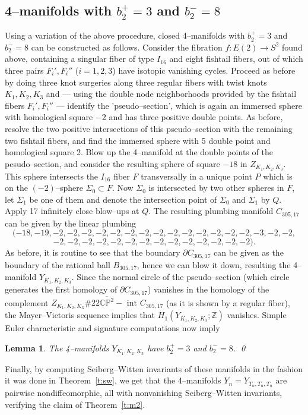 \documentclass[11pt]{gtart}
\newtheorem{lem}[thm]{Lemma}
\theoremstyle{definition}
\numberwithin{equation}{section}
\newcommand{\bfz}{{\mathbb {Z}}}
\newcommand{\cpkk}{{\overline {{\mathbb C}{\mathbb P}^2}}}
\begin{document}
\subsection{4--manifolds with $b_2^+=3$ and $b_2^-=8$}
Using a variation of the above procedure, closed 4--manifolds with
$b_2^+=3$ and $b_2^-=8$ can be constructed as follows. Consider the
fibration $f\colon E(2) \to S^2$ found above, containing a singular
fiber of type $I_{16}$ and eight fishtail fibers, out of which three
pairs $F_i', F_i''$ ($i=1,2,3$) have isotopic vanishing cycles.
Proceed as before by doing three knot surgeries along three regular
fibers with twist knots $K_1,K_2,K_3$ and --- using the double node
neighborhoods provided by the fishtail fibers $F_i',F_i''$ ---
identify the 'pseudo--section', which is again an immersed sphere
with homological square $-2$ and has three positive double points. As
before, resolve the two positive intersections of this
pseudo--section with the remaining two fishtail fibers, and find the
immersed sphere with 5 double point and homological square 2. Blow up
the 4--manifold at the double points of the pesudo--section, and
consider the resulting sphere of square $-18$ in
$Z_{K_1,K_2,K_3}$. This sphere intersects the $I_{16}$ fiber $F$
transversally in a unique point $P$ which is on the $(-2)$--sphere
$\Sigma _0 \subset F$. Now $\Sigma _0$ is intersected by two other
spheres in $F$, let $\Sigma _1$ be one of them and denote the
intersection point of $\Sigma _0$ and $\Sigma _1$ by $Q$. Apply 17
infinitely close blow--ups at $Q$. The resulting plumbing manifold
$C_{305,17}$ can be given by the linear plumbing
\[
(-18,-19,-2,-2,-2,-2,-2,-2,-2,-2,-2,-2,-2,-2,-2,-2,-3,-2,-2,
\]
\[
-2,-2,-2,-2,-2,-2, -2,-2,-2,-2,-2,-2,-2,-2).
\] 
As before, it is routine to see that the boundary
$\partial C_{305,17}$ can be given as the boundary of the rational
ball $B_{305,17}$, hence we can blow it down, resulting the 
4--manifold $Y_{K_1,K_2,K_3}$. Since the normal circle of the 
pseudo--section (which circle generates the first homology
of $\partial C_{305,17}$) vanishes in the homology of the
complement $Z_{K_1,K_2,K_3}\#22\cpkk - {\mbox { int }}C_{305,17}$
(as it is shown by a regular fiber), the Mayer--Vietoris sequence
implies that $H_1(Y_{K_1,K_2,K_3}; \bfz )$ vanishes. Simple
Euler characteristic and signature computations now imply
\begin{lem}
The 4--manifolds $Y_{K_1,K_2,K_3}$ have $b_2^+=3$ and $b_2^-=8$. \qed
\end{lem}

Finally, by computing Seiberg--Witten invariants of these manifolds in
the fashion it was done in Theorem~\ref{t:sw}, we get that the
4--manifolds $Y_n=Y_{T_n, T_n,T_n}$ are pairwise nondiffeomorphic, all
with nonvanishing Seiberg--Witten invariants, verifying the claim of
Theorem~\ref{t:m2}.
\end{document}
